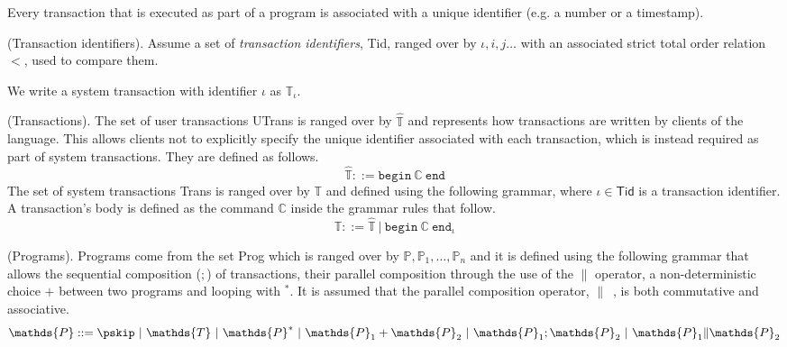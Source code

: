 Every transaction that is executed as part of a program is associated with a unique identifier (e.g. a number or a timestamp).
\begin{param}
	(Transaction identifiers).
	 Assume a set of \emph{transaction identifiers}, \textsf{Tid}, ranged over by $\iota, i, j \ldots$ with an associated strict total order relation $<$, used to compare them.
\end{param}
We write a system transaction with identifier $\iota$ as $\mathds{T}_\iota$. 

\begin{defn}
	(Transactions).
	The set of user transactions \textsf{UTrans} is ranged over by $\hat{\mathds{T}}$ and represents how transactions are written by clients of the language. This allows clients not to explicitly specify the unique identifier associated with each transaction, which is instead required as part of system transactions. They are defined as follows.
	\[
		\hat{\mathds{T}} ::=
			\mathtt{begin}\ \mathds{C}\ \mathtt{end}
	\]
	The set of system transactions \textsf{Trans} is ranged over by $\mathds{T}$ and defined using the following grammar, where $\iota \in \mathsf{Tid}$ is a transaction identifier. A transaction's body is defined as the command $\mathds{C}$ inside the grammar rules that follow.
	\[
		\mathds{T} ::=
			\hat{\mathds{T}}\
			|\ \mathtt{begin}\ \mathds{C}\ \mathtt{end}_\iota
	\]
\end{defn}

\begin{defn}
	(Programs).
	Programs come from the set \textsf{Prog} which is ranged over by $\mathds{P}, \mathds{P}_1, \ldots, \mathds{P}_n$ and it is defined using the following grammar that allows the sequential composition ($;$) of transactions, their parallel composition through the use of the $\|$ operator, a non-deterministic choice $+$ between two programs and looping with $^*$. It is assumed that the parallel composition operator, $\|$\ , is both commutative and associative.
	\[
		\mathds{P} ::=
			\pskip\
			|\ \mathds{T}\
			|\ \mathds{P}^*\
			|\ \mathds{P}_1 + \mathds{P}_2\
			|\ \mathds{P}_1; \mathds{P}_2\
			|\ \mathds{P}_1 \| \mathds{P}_2
	\]
\end{defn}